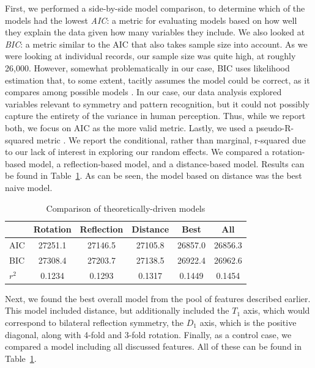 First, we performed a side-by-side model comparison, to determine which of the models had the lowest \textit{AIC}: a metric for evaluating models based on how well they explain the data given how many variables they include. We also looked at \textit{BIC}: a metric similar to the AIC that also takes sample size into account.  As we were looking at individual records, our sample size was quite high, at roughly 26,000. However, somewhat problematically in our case, BIC uses likelihood estimation that, to some extent, tacitly assumes the model could be correct, as it compares among possible models \citep{modelselect}\citep{techreport}. In our case, our data analysis explored variables relevant to symmetry and pattern recognition, but it could not possibly capture the entirety of the variance in human perception. Thus, while we report both, we focus on AIC as the more valid metric. Lastly, we used a pseudo-R-squared metric \citep{r2}. We report the conditional, rather than marginal, r-squared due to our lack of interest in exploring our random effects. We compared a rotation-based model, a reflection-based model, and a distance-based model. Results can be found in Table~\ref{results}. As can be seen, the model based on distance was the best naive model. 

\begin{table}
\centering
\begin{tabular}{|l|ccccc|}
\hline
& Rotation & Reflection & Distance & Best & All \\ \hline
AIC & 27251.1 &  27146.5 & 27105.8 & 26857.0 & 26856.3 \\ \hline
BIC & 27308.4 & 27203.7 & 27138.5 & 26922.4 & 26962.6 \\ \hline
$r^2$& 0.1234 & 0.1293 & 0.1317 & 0.1449 & 0.1454  \\ \hline
\end{tabular}
\label{results}
\caption{Comparison of theoretically-driven models}
\end{table}

Next, we found the best overall model from the pool of features described earlier. This model included distance, but additionally included the $T_1$ axis, which would correspond to bilateral reflection symmetry, the $D_1$ axis, which is the positive diagonal, along with 4-fold and 3-fold rotation. Finally, as a control case, we compared a model including all discussed features. All of these can be found in Table~\ref{results}.